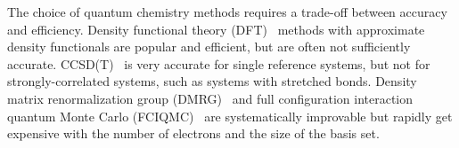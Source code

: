 \documentclass[%
preprint,
 superscriptaddress,
 amsmath,amssymb,
 aps,
]{revtex4-1}
\begin{document}
The choice of quantum chemistry methods requires a trade-off between accuracy and efficiency.
Density functional theory
(DFT)~\cite{ParYan-BOOK-89,DreGro-BOOK-90,kohn1999nobel}
methods with approximate density functionals
are popular and efficient, but are often not sufficiently accurate.  CCSD(T)~\cite{raghavachari1989fifth} is very accurate for single reference systems, but
not for strongly-correlated systems, such as systems with stretched bonds.
Density matrix renormalization group (DMRG)~\cite{white1993density,white1999ab,chan2002highly,chan2011density,ShaCha-JCP-12,olivares2015ab,schollwock2005density,GuoLiCha-JCTC-18}
and full configuration interaction quantum Monte Carlo (FCIQMC)~\cite{BooThoAla-JCP-09,CleBooAla-JCP-10,PetHolChaNigUmr-PRL-12,BooGruKreAla-Nat-13,HolChaUmr-JCTC-16}
are systematically improvable but rapidly get expensive with the number of electrons and the size of the basis set.

\end{document}
